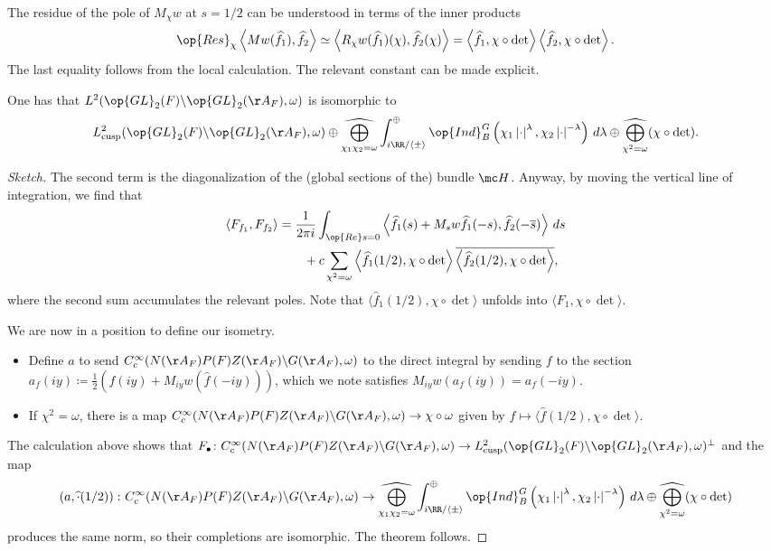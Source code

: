 \documentclass{article}
\begin{document}
\begin{remark}
	The residue of the pole of $M_\chi w$ at $s=1/2$ can be understood in terms of the inner products
	\[\op{Res}_\chi\left\langle Mw(\widehat f_1),\widehat f_2\right\rangle\simeq\left\langle R_\chi w(\widehat f_1)(\chi),\widehat f_2(\chi)\right\rangle=\left\langle\widehat f_1,\chi\circ\det\right\rangle\left\langle\widehat f_2,\chi\circ\det\right\rangle.\]
	The last equality follows from the local calculation. The relevant constant can be made explicit.
\end{remark}
\begin{theorem}
	One has that $L^2(\op{GL}_2(F)\backslash\op{GL}_2(\AA_F),\omega)$ is isomorphic to
	\[L^2_{\mathrm{cusp}}(\op{GL}_2(F)\backslash\op{GL}_2(\AA_F),\omega)\oplus\widehat{\bigoplus_{\chi_1\chi_2=\omega}}\int_{i\RR/\langle\pm\rangle}^\oplus\op{Ind}_B^G\left(\chi_1\left|\cdot\right|^\lambda,\chi_2\left|\cdot\right|^{-\lambda}\right)\,d\lambda\oplus\widehat{\bigoplus_{\chi^2=\omega}}({\chi\circ\det}).\]
\end{theorem}
\begin{proof}[Sketch]
	The second term is the diagonalization of the (global sections of the) bundle $\mc H$. Anyway, by moving the vertical line of integration, we find that
	\begin{align*}
		\langle F_{f_1},F_{f_2}\rangle &= \frac1{2\pi i}\int_{\op{Re}s=0}\left\langle\widehat f_1(s)+M_sw\widehat f_1(-s),\widehat f_2(-\overline s)\right\rangle\,ds \\
		&\qquad+c\sum_{\chi^2=\omega}\left\langle\widehat f_1(1/2),\chi\circ\det\right\rangle\overline{\left\langle\widehat f_2(1/2),\chi\circ\det\right\rangle},
	\end{align*}
	where the second sum accumulates the relevant poles. Note that $\langle\widehat f_1(1/2),{\chi\circ\det}\rangle$ unfolds into $\langle F_1,{\chi\circ\det}\rangle$.

	We are now in a position to define our isometry.
	\begin{itemize}
		\item Define $a$ to send $C_c^\infty(N(\AA_F)P(F)Z(\AA_F)\backslash G(\AA_F),\omega)$ to the direct integral by sending $f$ to the section $a_f(iy)\coloneqq\frac12(\widehat f(iy)+M_{iy}w(\widehat f(-iy)))$, which we note satisfies $M_{iy}w(a_f(iy))=a_f(-iy)$.
		\item If $\chi^2=\omega$, there is a map $C_c^\infty(N(\AA_F)P(F)Z(\AA_F)\backslash G(\AA_F),\omega)\to\chi\circ\omega$ given by $f\mapsto\langle\widehat f(1/2),{\chi\circ\det}\rangle$.
	\end{itemize}
	The calculation above shows that $F_\bullet\colon C_c^\infty(N(\AA_F)P(F)Z(\AA_F)\backslash G(\AA_F),\omega)\to L^2_{\mathrm{cusp}}(\op{GL}_2(F)\backslash\op{GL}_2(\AA_F),\omega)^\perp$ and the map
	\[\left(a,\widehat\cdot(1/2)\right)\colon C_c^\infty(N(\AA_F)P(F)Z(\AA_F)\backslash G(\AA_F),\omega)\to \widehat{\bigoplus_{\chi_1\chi_2=\omega}}\int_{i\RR/\langle\pm\rangle}^\oplus\op{Ind}_B^G\left(\chi_1\left|\cdot\right|^\lambda,\chi_2\left|\cdot\right|^{-\lambda}\right)\,d\lambda\oplus\widehat{\bigoplus_{\chi^2=\omega}}({\chi\circ\det})\]
	produces the same norm, so their completions are isomorphic. The theorem follows.
\end{proof}
\end{document}
